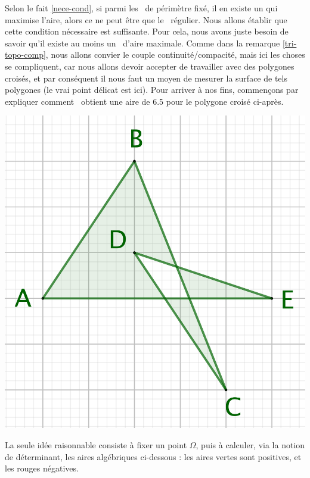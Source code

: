 Selon le fait \ref{nece-cond}, si parmi les \ngones\ de périmètre fixé, il en existe un qui maximise l'aire, alors ce ne peut être que le \ngone\ régulier. Nous allons établir que cette condition nécessaire est suffisante. Pour cela, nous avons juste besoin de savoir qu'il existe au moins un \ngone\ d'aire maximale.
Comme dans la remarque \ref{tri-topo-comp}, nous allons convier le couple continuité/compacité, mais ici les choses se compliquent, car nous allons devoir accepter de travailler avec des polygones croisés, et par conséquent il nous faut un moyen de mesurer la surface de tels polygones (le vrai point délicat est ici). 
Pour arriver à nos fins, commençons par expliquer comment \geogebra\ obtient une aire de \num{6.5} pour le polygone croisé ci-après.


\begin{center}
    \includegraphics[scale=.4]{content/polygon/sufficient-cond/why.png}
\end{center}


\medskip
 

La seule idée raisonnable consiste à fixer un point $\Omega$, puis à calculer, via la notion de déterminant, les aires algébriques ci-dessous : les aires vertes sont positives, et les rouges négatives.%

